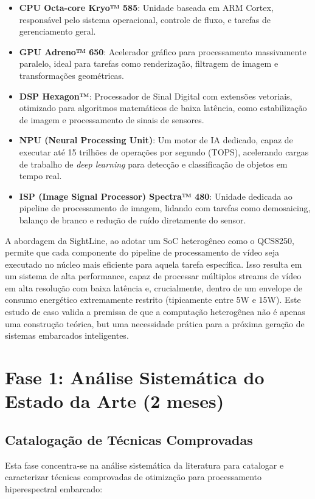 \begin{itemize}
    \item \textbf{CPU Octa-core Kryo™ 585}: Unidade baseada em ARM Cortex, responsável pelo sistema operacional, controle de fluxo, e tarefas de gerenciamento geral.
    \item \textbf{GPU Adreno™ 650}: Acelerador gráfico para processamento massivamente paralelo, ideal para tarefas como renderização, filtragem de imagem e transformações geométricas.
    \item \textbf{DSP Hexagon™}: Processador de Sinal Digital com extensões vetoriais, otimizado para algoritmos matemáticos de baixa latência, como estabilização de imagem e processamento de sinais de sensores.
    \item \textbf{NPU (Neural Processing Unit)}: Um motor de IA dedicado, capaz de executar até 15 trilhões de operações por segundo (TOPS), acelerando cargas de trabalho de \textit{deep learning} para detecção e classificação de objetos em tempo real.
    \item \textbf{ISP (Image Signal Processor) Spectra™ 480}: Unidade dedicada ao pipeline de processamento de imagem, lidando com tarefas como demosaicing, balanço de branco e redução de ruído diretamente do sensor.
\end{itemize}

A abordagem da SightLine, ao adotar um SoC heterogêneo como o QCS8250, permite que cada componente do pipeline de processamento de vídeo seja executado no núcleo mais eficiente para aquela tarefa específica. Isso resulta em um sistema de alta performance, capaz de processar múltiplos streams de vídeo em alta resolução com baixa latência e, crucialmente, dentro de um envelope de consumo energético extremamente restrito (tipicamente entre 5W e 15W). Este estudo de caso valida a premissa de que a computação heterogênea não é apenas uma construção teórica, but uma necessidade prática para a próxima geração de sistemas embarcados inteligentes.


\section{Fase 1: Análise Sistemática do Estado da Arte (2 meses)}

\subsection{Catalogação de Técnicas Comprovadas}

Esta fase concentra-se na análise sistemática da literatura para catalogar e caracterizar técnicas comprovadas de otimização para processamento hiperespectral embarcado:

